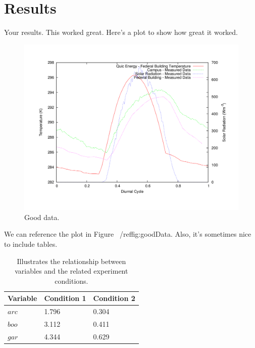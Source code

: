 \chapter{Results}
\label{chap:results}

Your results.  This worked great.  Here's a plot to show how great it worked.  

\begin{figure}
\centering
\includegraphics[scale=.4]{images/goodData.png}
\caption{Good data.}
\label{fig:goodData}
\end{figure} 

We can reference the plot in Figure ~/ref{fig:goodData}. Also, it's sometimes nice to include tables.

\begin{table}
\begin{center}
  \begin{tabular}{ | l | l | l | }
    \hline
    Variable & Condition 1 & Condition 2 \\ \hline
    \(arc\) & 1.796 & 0.304 \\ \hline 
    \(boo\) & 3.112 & 0.411 \\ \hline 
    \(gar\) & 4.344 & 0.629 \\ 
    \hline
  \end{tabular}
\end{center}
\caption{Illustrates the relationship between variables and the related experiment conditions.}
\label{tid:dataCond12}
\end{table}
